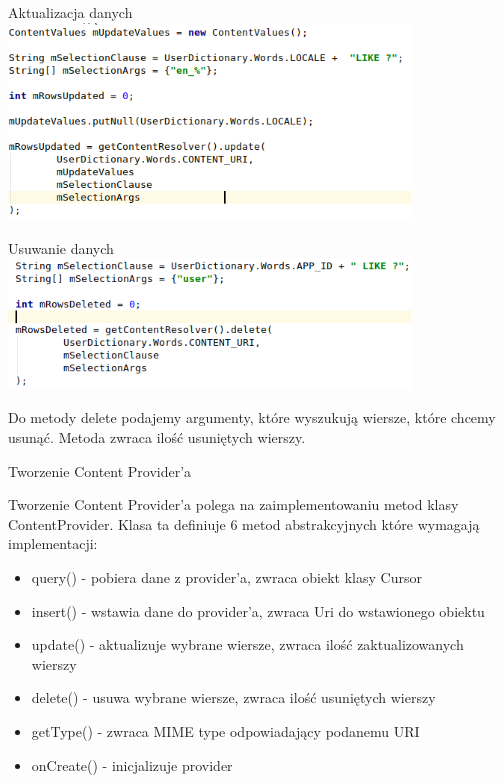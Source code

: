 \documentclass{beamer}
\begin{document}
\begin{frame}{Aktualizacja danych}
	\centering
	\includegraphics[width=0.8\textwidth]{update}
\end{frame}

\begin{frame}{Usuwanie danych}
	\includegraphics[width=0.8\textwidth]{delete}
	\begin{block}{}
		Do metody delete podajemy argumenty, które wyszukują wiersze, które chcemy usunąć. Metoda zwraca ilość usuniętych wierszy.
	\end{block}
\end{frame}

\begin{frame}{Tworzenie Content Provider'a}
	\begin{block}{}
		Tworzenie Content Provider'a polega na zaimplementowaniu metod klasy ContentProvider. Klasa ta definiuje 6 metod abstrakcyjnych które wymagają implementacji:
		\begin{itemize}
			\item query() - pobiera dane z provider'a, zwraca obiekt klasy Cursor
			\item insert() - wstawia dane do provider'a, zwraca Uri do wstawionego obiektu
			\item update() - aktualizuje wybrane wiersze, zwraca ilość zaktualizowanych wierszy
			\item delete() - usuwa wybrane wiersze, zwraca ilość usuniętych wierszy
			\item getType() - zwraca MIME type odpowiadający podanemu URI
			\item onCreate() - inicjalizuje provider
		\end{itemize}
	\end{block}
\end{frame}
\end{document}
